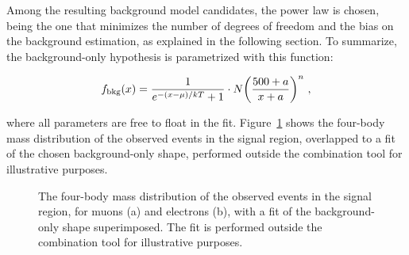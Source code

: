 Among the resulting background model candidates, the power law is chosen, being the one that
minimizes the number of degrees of freedom and the bias on the background estimation, as explained
in the following section. To summarize, the background-only hypothesis is parametrized with this
function:

\begin{equation}
f_{\textnormal{bkg}}(x) = \frac{1}{e^{-(x-\mu)/kT} + 1} \cdot N \bigg(\frac{500+a}{x+a}\bigg)^n~,
\label{eq:fit_bkgModel}
\end{equation}

where all parameters are free to float in the fit. Figure~\ref{fig:backgroundShape} shows the
four-body mass distribution of the observed events in the signal region, overlapped to a fit of the
chosen background-only shape, performed outside the combination tool for illustrative purposes.

\begin{figure}[htb]
\begin{center}

  \caption{The four-body mass distribution of the observed events in the signal region, for
          muons (a) and electrons (b), with a fit of the background-only shape
          superimposed. The fit is performed outside the combination
          tool for illustrative purposes.}
  \label{fig:backgroundShape}
\end{center}
\end{figure}



